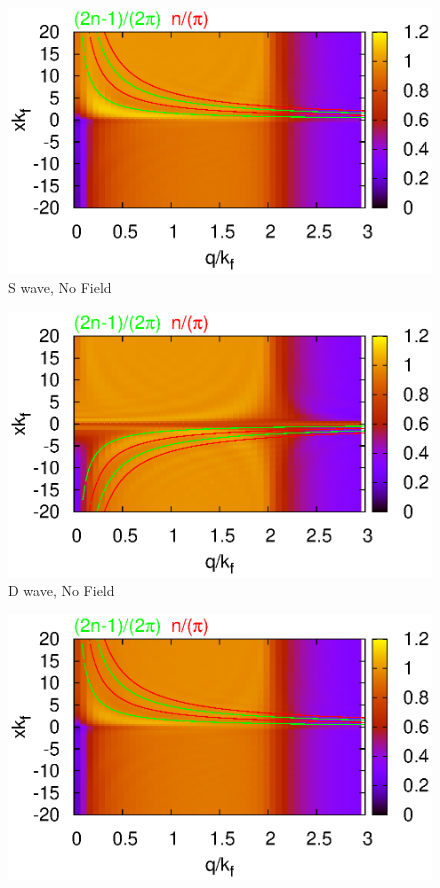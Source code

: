 \documentclass[aps,prl,twocolumn,showpacs,amsmath,amssymb]{revtex4-1}
\begin{document}
\begin{widetext}
\begin{figure}
\includegraphics[width=0.7\linewidth]{surface_perp_s_noF.eps}
\caption{ 
	\label{fig:qq} S wave, No Field
} 
\end{figure}
\begin{figure}
\includegraphics[width=0.7\linewidth]{surface_perp_d_noF.eps}
\caption{ 
	\label{fig:qq} D wave, No Field
} 
\end{figure}
\begin{figure}
\includegraphics[width=0.7\linewidth]{surface_perp_s_F.eps}

\end{figure}
\end{widetext}
\end{document}
